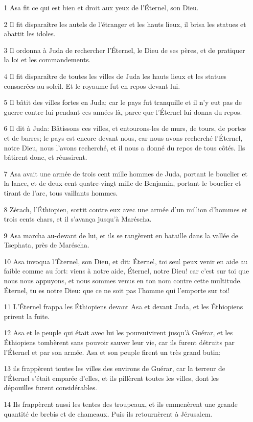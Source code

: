 \par 1 Asa fit ce qui est bien et droit aux yeux de l'Éternel, son Dieu.
\par 2 Il fit disparaître les autels de l'étranger et les hauts lieux, il brisa les statues et abattit les idoles.
\par 3 Il ordonna à Juda de rechercher l'Éternel, le Dieu de ses pères, et de pratiquer la loi et les commandements.
\par 4 Il fit disparaître de toutes les villes de Juda les hauts lieux et les statues consacrées au soleil. Et le royaume fut en repos devant lui.
\par 5 Il bâtit des villes fortes en Juda; car le pays fut tranquille et il n'y eut pas de guerre contre lui pendant ces années-là, parce que l'Éternel lui donna du repos.
\par 6 Il dit à Juda: Bâtissons ces villes, et entourons-les de murs, de tours, de portes et de barres; le pays est encore devant nous, car nous avons recherché l'Éternel, notre Dieu, nous l'avons recherché, et il nous a donné du repos de tous côtés. Ils bâtirent donc, et réussirent.
\par 7 Asa avait une armée de trois cent mille hommes de Juda, portant le bouclier et la lance, et de deux cent quatre-vingt mille de Benjamin, portant le bouclier et tirant de l'arc, tous vaillants hommes.
\par 8 Zérach, l'Éthiopien, sortit contre eux avec une armée d'un million d'hommes et trois cents chars, et il s'avança jusqu'à Maréscha.
\par 9 Asa marcha au-devant de lui, et ils se rangèrent en bataille dans la vallée de Tsephata, près de Maréscha.
\par 10 Asa invoqua l'Éternel, son Dieu, et dit: Éternel, toi seul peux venir en aide au faible comme au fort: viens à notre aide, Éternel, notre Dieu! car c'est sur toi que nous nous appuyons, et nous sommes venus en ton nom contre cette multitude. Éternel, tu es notre Dieu: que ce ne soit pas l'homme qui l'emporte sur toi!
\par 11 L'Éternel frappa les Éthiopiens devant Asa et devant Juda, et les Éthiopiens prirent la fuite.
\par 12 Asa et le peuple qui était avec lui les poursuivirent jusqu'à Guérar, et les Éthiopiens tombèrent sans pouvoir sauver leur vie, car ils furent détruits par l'Éternel et par son armée. Asa et son peuple firent un très grand butin;
\par 13 ils frappèrent toutes les villes des environs de Guérar, car la terreur de l'Éternel s'était emparée d'elles, et ils pillèrent toutes les villes, dont les dépouilles furent considérables.
\par 14 Ils frappèrent aussi les tentes des troupeaux, et ils emmenèrent une grande quantité de brebis et de chameaux. Puis ils retournèrent à Jérusalem.

